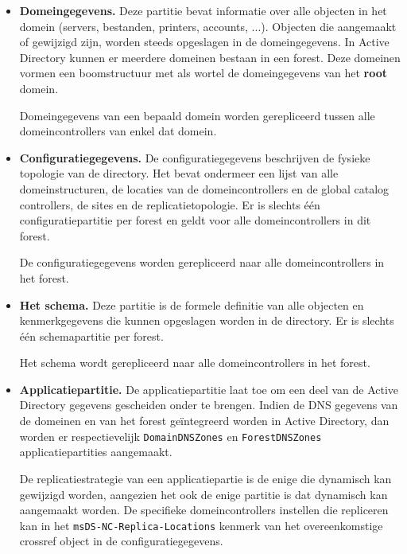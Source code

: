 \begin{enumerate}
{		}
		
		 {
			\begin{itemize}
				\item \textbf{Domeingegevens.} Deze partitie bevat informatie over alle objecten in het domein (servers, bestanden, printers, accounts, ...). Objecten die aangemaakt of gewijzigd zijn, worden steeds opgeslagen in de domeingegevens. In Active Directory kunnen er meerdere domeinen bestaan in een forest. Deze domeinen vormen een boomstructuur met als wortel de domeingegevens van het \textbf{root} domein. 
				
				Domeingegevens van een bepaald domein worden gerepliceerd tussen alle domeincontrollers van enkel dat domein.

				\item \textbf{Configuratiegegevens.} De configuratiegegevens beschrijven de fysieke topologie van de directory. Het bevat ondermeer een lijst van alle domeinstructuren, de locaties van de domeincontrollers en de global catalog controllers, de sites en de replicatietopologie. Er is slechts één configuratiepartitie per forest en geldt voor alle domeincontrollers in dit forest.

				De configuratiegegevens worden gerepliceerd naar alle domeincontrollers in het forest.
				\item \textbf{Het schema.} Deze partitie is de formele definitie van alle objecten en kenmerkgegevens die kunnen opgeslagen worden in de directory. Er is slechts één schemapartitie per forest.

				Het schema wordt gerepliceerd naar alle domeincontrollers in het forest.
				\item \textbf{Applicatiepartitie.} De applicatiepartitie laat toe om een deel van de Active Directory gegevens gescheiden onder te brengen. Indien de DNS gegevens van de domeinen en van het forest geïntegreerd worden in Active Directory, dan worden er respectievelijk \texttt{DomainDNSZones} en \texttt{ForestDNSZones} applicatiepartities aangemaakt.
				
				De replicatiestrategie van een applicatiepartie is de enige die dynamisch kan gewijzigd worden, aangezien het ook de enige partitie is dat dynamisch kan aangemaakt worden. De specifieke domeincontrollers instellen die repliceren kan in het \texttt{msDS-NC-Replica-Locations} kenmerk van het overeenkomstige crossref object in de configuratiegegevens. 
			\end{itemize}
			
		}
	\end{enumerate}
	
